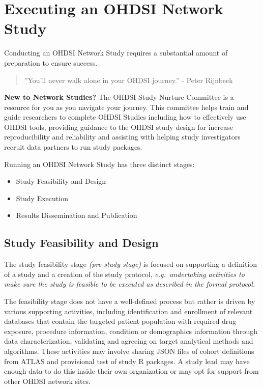 \documentclass[11pt]{book}
\providecommand{\tightlist}{%
  \setlength{\itemsep}{0pt}\setlength{\parskip}{0pt}}
\theoremstyle{definition}
\theoremstyle{definition}
\theoremstyle{definition}
\theoremstyle{remark}
\let\BeginKnitrBlock\begin \let\EndKnitrBlock\end
\begin{document}
\hypertarget{executing-an-ohdsi-network-study}{%
\section{Executing an OHDSI Network Study}\label{executing-an-ohdsi-network-study}}

Conducting an OHDSI Network Study requires a substantial amount of preparation to ensure success.

\begin{quote}
''You'll never walk alone in your OHDSI journey.'' - Peter Rijnbeek
\end{quote}

\BeginKnitrBlock{rmdimportant}
\textbf{New to Network Studies?} The OHDSI Study Nurture Committee is a resource for you as you navigate your journey. This committee helps train and guide researchers to complete OHDSI Studies including how to effectively use OHDSI tools, providing guidance to the OHDSI study design for increase reproducibility and reliability and assisting with helping study investigators recruit data partners to run study packages.
\EndKnitrBlock{rmdimportant}

Running an OHDSI Network Study has three distinct stages:

\begin{itemize}
\tightlist
\item
  Study Feasibility and Design
\item
  Study Execution
\item
  Results Dissemination and Publication
\end{itemize}

\hypertarget{study-feasibility-and-design}{%
\subsection{Study Feasibility and Design}\label{study-feasibility-and-design}}

The study feasibility stage \emph{(pre-study stage)} is focused on supporting a definition of a study and a creation of the study protocol, \emph{e.g.~undertaking activities to make sure the study is feasible to be executed as described in the formal protocol.}

The feasibility stage does not have a well-defined process but rather is driven by various supporting activities, including identification and enrollment of relevant databases that contain the targeted patient population with required drug exposure, procedure information, condition or demographics information through data characterization, validating and agreeing on target analytical methods and algorithms. These activities may involve sharing JSON files of cohort definitions from ATLAS and provisional test of study R packages. A study lead may have enough data to do this inside their own organization or may opt for support from other OHDSI network sites.
\end{document}
